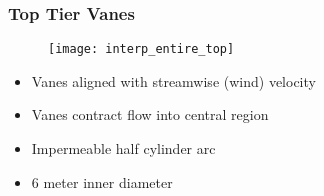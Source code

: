 \documentclass[mathserif]{beamer}
\begin{document}
\begin{frame}
 \frametitle{Top Tier Vanes}
    \begin{figure}[htb]
     \centering
     \texttt{[image: interp\_entire\_top]}
    \end{figure}


   
 
 \begin{block}{}
  \begin{itemize}
   \item Vanes aligned with streamwise (wind) velocity
   \item Vanes contract flow into central region
   \item Impermeable half cylinder arc
   \item 6 meter inner diameter
  \end{itemize}
 \end{block}
\end{frame}
\end{document}
